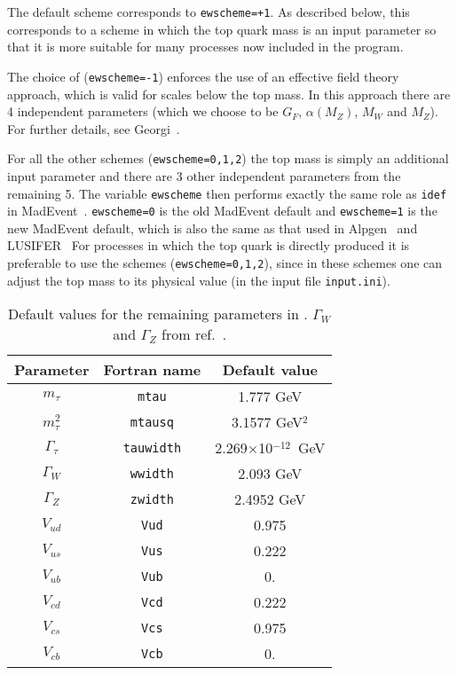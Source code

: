 The default scheme corresponds to {\tt ewscheme=+1}. As described below, this corresponds to a scheme
in which the top quark mass is an input parameter so that it is
more suitable for many processes now included in the program.

The choice of ({\tt ewscheme=-1}) enforces the use of an effective field
theory approach, which is valid for scales below the top mass. In this
approach there are 4 independent parameters (which we choose to be
$G_F$, $\alpha(M_Z)$, $M_W$ and $M_Z$). For further details,
see Georgi~\cite{Georgi:1991ci}.

For all the other schemes ({\tt ewscheme=0,1,2}) the top mass is simply
an additional input parameter and there are 3 other independent
parameters from the remaining 5. The variable {\tt ewscheme} then performs
exactly the same role as {\tt idef} in MadEvent~\cite{Maltoni:2002qb}.
{\tt ewscheme=0} is the old MadEvent default and {\tt ewscheme=1} is the
new MadEvent default, which is also the same as that used in 
Alpgen~\cite{Alpgen} and LUSIFER~\cite{Lusifer} 
For processes in which the top quark is directly produced  it is 
preferable to use  the schemes ({\tt ewscheme=0,1,2}), since in these schemes
one can adjust the top mass to its physical value (in the input file
{\tt input.ini}).

\begin{table}
\begin{center}
	\caption{Default values for the remaining parameters in \MCFM.
		$\Gamma_W$ and $\Gamma_Z$ from ref.~\cite{Amsler:2008zzb}.}
	\label{default} 
	\vspace{0.5em}
\begin{tabular}{|c|c|c|} \hline
Parameter & Fortran name & Default value \\ 
\hline
$m_\tau$         & {\tt mtau}      & 1.777 GeV            \\
$m^2_\tau$& {\tt mtausq}  & 3.1577 GeV$^2$     \\
$\Gamma_\tau$    & {\tt tauwidth}& 2.269$\times$10$^{-12}$~GeV \\
$\Gamma_W$       & {\tt wwidth}  & 2.093 GeV               \\
$\Gamma_Z$       & {\tt zwidth}  & 2.4952 GeV               \\
$V_{ud}$         & {\tt Vud}     & 0.975                  \\
$V_{us}$         & {\tt Vus}     & 0.222             \\
$V_{ub}$         & {\tt Vub}     & 0.                     \\
$V_{cd}$         & {\tt Vcd}     & 0.222             \\
$V_{cs}$         & {\tt Vcs}     & 0.975                  \\
$V_{cb}$         & {\tt Vcb}     & 0.                     \\
\hline
\end{tabular}

\end{center}
\end{table}

